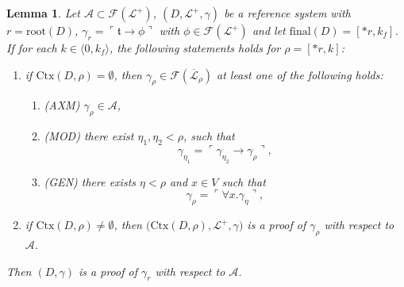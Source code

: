 \documentclass[10pt]{article}
\theoremstyle{plain}
\newtheorem{lemma}[theorem]{Lemma}
\newcommand{\F}{\mathcal{F}}
\renewcommand{\root}{\text{root}}
\newcommand{\final}{\text{final}}
\newcommand{\truth}{\mathfrak{t}}
\newcommand{\context}{\text{Ctx}}
\renewcommand{\L}{\mathscr{L}}
\begin{document}
\begin{lemma}
\label{flatten}
Let $\mathcal{A} \subset \F(\L^+)$, 
$(D, \L^+, \gamma)$ be a reference system with $r = \root(D)$, $\gamma_r = \ulcorner \truth \to \phi \urcorner$ with $\phi \in \F(\L^+)$
and let $\final(D) = [*r,k_f]$.
If for each $k\in \langle 0, k_f \rangle$, the following statements holds for 
$\rho=[*r,k]$:
\begin{enumerate}
\item if $\context(D, \rho) = \emptyset$, then $\gamma_\rho\in\F(\overline{\L}_\rho)$ at least one of the following holds:
\begin{enumerate}
\item (AXM) $\gamma_\rho\in \mathcal{A}$,
\item (MOD) there exist $\eta_1, \eta_2 < \rho$, such that
\begin{equation}
\gamma_{\eta_1} = \ulcorner \gamma_{\eta_2} \to \gamma_\rho \urcorner,
\end{equation}
\item (GEN) there exists $\eta < \rho$ and $x\in V$ such that
\begin{equation}
\gamma_\rho = \ulcorner \forall x. \gamma_\eta \urcorner,
\end{equation}
\end{enumerate}
\item if $\context(D, \rho) \not= \emptyset$, 
then $\big(\context(D, \rho), \L^+, \gamma\big)$ is a proof of $\gamma_\rho$ with respect to $\mathcal{A}$.
\end{enumerate}
Then $(D, \gamma)$ is a proof of $\gamma_r$ with respect to $\mathcal{A}$.
\end{lemma}
\end{document}
